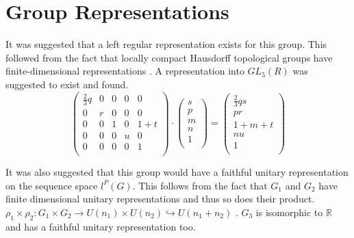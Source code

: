 \documentclass{article}
\begin{document}
\section{Group Representations}
It was suggested that  a left regular representation exists for this group. This followed from the fact that locally compact Hausdorff topological groups have finite-dimensional representations \cite{4498337}. A representation into $GL_5(R)$  was suggested to exist \cite{4498337} and found. 
\[
\begin{pmatrix} \frac{2}{3}q & 0 & 0 & 0 & 0\\
                    0& r & 0 & 0 & 0\\                                              
                    0 & 0 & 1 & 0 & 1+ t\\                                                               0 & 0 & 0 & u & 0\\                                     
                    0 & 0 & 0 & 0 & 1 \\                                              
                    \end{pmatrix}
\cdot
 \begin{pmatrix} s \\
                          p \\                         
                          m\\                                                                         n\\                                         
                          1\\ \end{pmatrix}
= \begin{pmatrix} \frac{2}{3} qs\\
                              pr \\                                                  
                              1+m+t\\                                                    
                              nu\\                             
                              1\\   \end{pmatrix}
\]

It was also suggested \cite{4498651} that this group would have a faithful unitary representation on the sequence space $l^P(G)$. This follows from the fact that $G_1$ and $G_2$ have finite dimensional unitary representations and thus so does their product. $\rho_1 \times \rho_2 : G_1 \times G_2 \to U(n_1) \times U(n_2) \hookrightarrow U(n_1 + n_2)$ . $G_3$ is isomorphic to $\mathbb{R}$  and has a faithful unitary representation\cite{4498651} too. 
\end{document}
